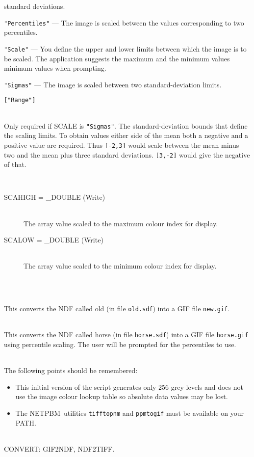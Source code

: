 \documentclass[twoside,11pt]{article}
\newcommand{\htmlref}[2]{#1}
\newcommand{\xref}[3]{#1}
\newcommand{\CONVERT}{{\footnotesize CONVERT}}
\newcommand{\Netpbm}{{\footnotesize NETPBM}}
\newlength{\sstexampleslength}
\newcommand{\sstresparameters}[1]{
   \goodbreak 
   \item[Results Parameters:] \mbox{} \\
   \vspace{-3.5ex}
   \begin{description}
      #1
   \end{description}
}
\newcommand{\sstexamples}[1]{
   \goodbreak
   \item[Examples:] \mbox{} \\
   \vspace{-3.5ex}
   \begin{description}
      #1
   \end{description}
}
\newcommand{\sstsubsection}[1]{ \item[{#1}] \mbox{} \\}
\newcommand{\sstexamplesubsection}[2]{\sloppy
\item[\parbox{\sstexampleslength}{\ssttt #1}] \mbox{} \vspace{0.5ex}
\\ #2 \vspace{1.0ex}}
\newcommand{\sstnotes}[1]{\pagebreak[3] \item[Notes:] \mbox{} \\[1.3ex] #1}
\newcommand{\sstdiytopic}[2]{\goodbreak \item[{\hspace{-0.35em}#1\hspace{-0.35em}:}] \mbox{} \\[1.3ex] #2}
\newcommand{\ssthitemlist}[1]{
  \latexonly{
  \mbox{} \\
  \vspace{-3.5ex}
  }
  \begin{itemize}
     #1
  \end{itemize}
}
\newcommand{\sstitem}{\item}
\newcommand{\sstresparameters}[1]{
      \item[\\ \xref{Results Parameters:}{sun95}{se_parout}] \\
      \begin{description}
         #1
      \end{description}
   }
\newcommand{\sstexamples}[1]{
   \item[\vspace{0.35ex}\htmlref{Examples:\vspace{-0.5ex}}{app_example}]
      \begin{description}
         #1
      \end{description}
      \\
   }
\newcommand{\sstsubsection}[1]{\item[{#1}]}
\newcommand{\sstexamplesubsection}[2]{
   \vspace{-1.0ex} \item[{\ssttt #1}] #2 \vspace{0.2ex}}
\newcommand{\sstnotes}[1]{\item[Notes:]
      \begin{description}
         #1
      \end{description}
   }
\newcommand{\sstdiytopic}[2]{\\ \item[{#1}:]
      \begin{description}
         #2
      \end{description}
   }
\newcommand{\sstitem}{\item}
\begin{document}
{\begin{description}
{{                          standard deviations.  
           \sstitem
           {\texttt{"Percentiles"}} --- The image is scaled between the values
                          corresponding to two percentiles.  
           \sstitem
           {\texttt{"Scale"}} --- You define the upper and lower limits
                          between which the image is to be scaled.  The
                          application suggests the maximum and the
                          minimum values minimum values when prompting.
           \sstitem
           {\texttt{"Sigmas"}} --- The image is scaled between two
                          standard-deviation limits.  
         }
         \texttt{["Range"]}
      }
      \sstsubsection{
        SIGMAS( 2 ) = \_REAL (Read)
      }{
        Only required if SCALE is {\texttt{"Sigmas"}}.
        The standard-deviation bounds that define the scaling limits.
        To obtain values either side of the mean both a negative and
        a positive value are required.  Thus {\texttt{[-2,3]}} would scale
        between the mean minus two and the mean plus three standard
        deviations.  {\texttt{[3,-2]}} would give the negative of that.
      }
   \end{description}
   \sstresparameters{
      \sstsubsection{
        SCAHIGH = \_DOUBLE (Write)
      }{
        The array value scaled to the maximum colour index for display.
      }
      \sstsubsection{
        SCALOW = \_DOUBLE (Write)
      }{
        The array value scaled to the minimum colour index for display.
      }
   }
   \sstexamples{
      \sstexamplesubsection{
         ndf2gif old new
      }{
         This converts the NDF called old (in file \texttt{old.sdf})
         into a GIF file \texttt{new.gif}.
      }
      \sstexamplesubsection{
         ndf2gif horse scale=pe
      }{
        This converts the NDF called horse (in file \texttt{horse.sdf})
        into a GIF file \texttt{horse.gif} using percentile scaling.
        The user will be prompted for the percentiles to use.
      }
   }
   \sstnotes{
      The following points should be remembered:
      \ssthitemlist{

         \sstitem
            This initial version of the script generates only 256 grey 
            levels and does not use the image colour lookup table so
            absolute data values may be lost.

         \sstitem
            The \Netpbm\ utilities \texttt{tifftopnm} and \texttt{ppmtogif}
            must be available on your PATH.
      }
   }
   \sstdiytopic{
      Related Applications
   }{
      \CONVERT: \htmlref{GIF2NDF}{GIF2NDF}, \htmlref{NDF2TIFF}{NDF2TIFF}.
   }
}
\end{document}
